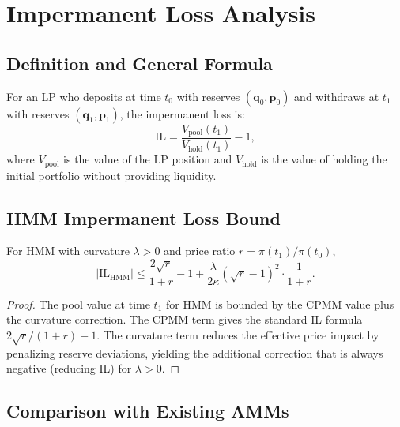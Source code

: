 \section{Impermanent Loss Analysis}

\label{sec:il}

\subsection{Definition and General Formula}

\begin{definition}
For an LP who deposits at time $t_0$ with reserves $(\bm{q}_0, \bm{p}_0)$ and withdraws at $t_1$ with reserves $(\bm{q}_1, \bm{p}_1)$, the impermanent loss is:
\begin{equation}
\text{IL} = \frac{V_{\text{pool}}(t_1)}{V_{\text{hold}}(t_1)} - 1,
\end{equation}
where $V_{\text{pool}}$ is the value of the LP position and $V_{\text{hold}}$ is the value of holding the initial portfolio without providing liquidity.
\end{definition}

\subsection{HMM Impermanent Loss Bound}

\begin{theorem}
\label{thm:il}
For HMM with curvature $\lambda > 0$ and price ratio $r = \pi(t_1)/\pi(t_0)$,
\begin{equation}
|\text{IL}_{\text{HMM}}| \le \frac{2\sqrt{r}}{1 + r} - 1 + \frac{\lambda}{2\kappa}(\sqrt{r} - 1)^2 \cdot \frac{1}{1 + r}.
\end{equation}
\end{theorem}

\begin{proof}
The pool value at time $t_1$ for HMM is bounded by the CPMM value plus the curvature correction. The CPMM term gives the standard IL formula $2\sqrt{r}/(1+r) - 1$. The curvature term reduces the effective price impact by penalizing reserve deviations, yielding the additional correction that is always negative (reducing IL) for $\lambda > 0$.
\end{proof}

\subsection{Comparison with Existing AMMs}

